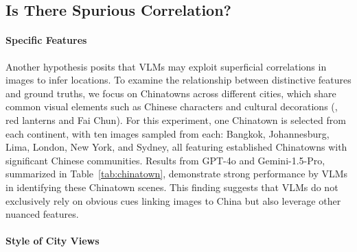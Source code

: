 \subsection{Is There Spurious Correlation?}

\paragraph{Specific Features}

Another hypothesis posits that VLMs may exploit superficial correlations in images to infer locations.
To examine the relationship between distinctive features and ground truths, we focus on Chinatowns across different cities, which share common visual elements such as Chinese characters and cultural decorations (\eg, red lanterns and Fai Chun).
For this experiment, one Chinatown is selected from each continent, with ten images sampled from each: Bangkok, Johannesburg, Lima, London, New York, and Sydney, all featuring established Chinatowns with significant Chinese communities.
Results from GPT-4o and Gemini-1.5-Pro, summarized in Table~\ref{tab:chinatown}, demonstrate strong performance by VLMs in identifying these Chinatown scenes.
This finding suggests that VLMs do not exclusively rely on obvious cues linking images to China but also leverage other nuanced features.

\paragraph{Style of City Views}

\begin{table}[t]
    \centering
\end{table}

